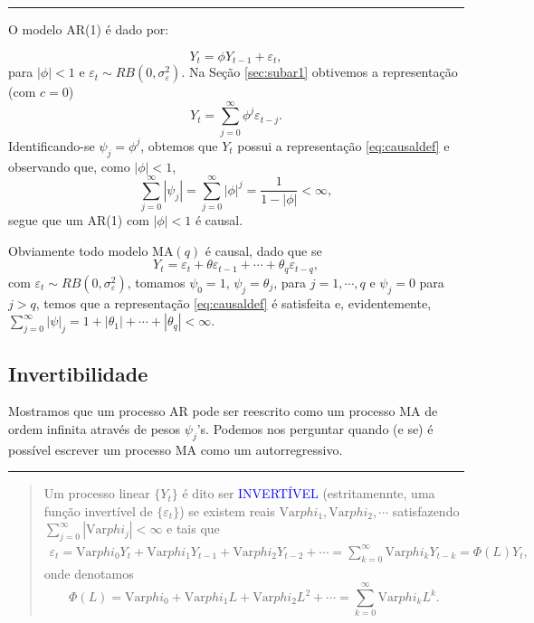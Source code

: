 \documentclass[
]{book}
\theoremstyle{definition}
\theoremstyle{definition}
\theoremstyle{definition}
\theoremstyle{remark}
\begin{document}
\begin{center}\rule{0.5\linewidth}{0.5pt}\end{center}

O modelo AR(1) é dado por:

\[
Y_t = \phi Y_{t-1} + \varepsilon_t,
\]
para \(|\phi|<1\) e \(\varepsilon_t\sim RB(0,\sigma^2_\varepsilon)\). Na Seção \ref{sec:subar1} obtivemos a representação (com \(c=0\))
\[Y_t = \sum_{j=0}^\infty \phi^j\varepsilon_{t-j}.\]
Identificando-se \(\psi_j= \phi^j\), obtemos que \(Y_t\) possui a representação \eqref{eq:causaldef} e observando que, como \(|\phi|<1\),
\[\sum_{j=0}^{\infty}|\psi_j|=\sum_{j=0}^{\infty}|\phi|^j=\frac1{1-|\phi|}<\infty,\]
segue que um AR(1) com \(|\phi|<1\) é causal.

Obviamente todo modelo MA\((q)\) é causal, dado que se
\[Y_t=\varepsilon_t+\theta\varepsilon_{t-1}+\cdots+\theta_q\varepsilon_{t-q},\]
com \(\varepsilon_t\sim RB(0, \sigma_\varepsilon^2)\), tomamos \(\psi_0=1\), \(\psi_j=\theta_j\), para \(j=1,\cdots,q\) e \(\psi_j=0\) para \(j>q\), temos que a representação \eqref{eq:causaldef} é satisfeita e, evidentemente, \(\sum_{j=0}^\infty|\psi|_j=1+|\theta_1|+\cdots+|\theta_q|<\infty\).

\hypertarget{invertibilidade}{%
\subsection{Invertibilidade}\label{invertibilidade}}

Mostramos que um processo AR pode ser reescrito como um processo MA de ordem infinita através de pesos \(\psi_j\)'s. Podemos nos perguntar quando (e se) é possível escrever um processo MA como
um autorregressivo.

\begin{center}\rule{0.5\linewidth}{0.5pt}\end{center}

\begin{quote}
Um processo linear \(\{Y_t \}\) é dito ser \textcolor{blue}{ INVERTÍVEL } (estritamennte, uma função invertível de \(\{\varepsilon_t \}\)) se existem reais \(\mbox{Var}phi_1,\mbox{Var}phi_2,\cdots\) satisfazendo \(\sum_{j=0}^{\infty}|\mbox{Var}phi_j|<\infty\) e tais que
\begin{align}
\varepsilon_t = \mbox{Var}phi_0Y_t+\mbox{Var}phi_1Y_{t-1}+\mbox{Var}phi_2Y_{t-2}+\cdots =\sum_{k=0}^\infty\mbox{Var}phi_kY_{t-k}=\Phi(L)Y_t,
\label{eq:invertdef}
\end{align}
onde denotamos
\[
\Phi(L) = \mbox{Var}phi_0 + \mbox{Var}phi_1 L + \mbox{Var}phi_2 L^2 + \cdots = \sum_{k=0}^\infty\mbox{Var}phi_kL^k.
\]
\end{quote}
\end{document}
